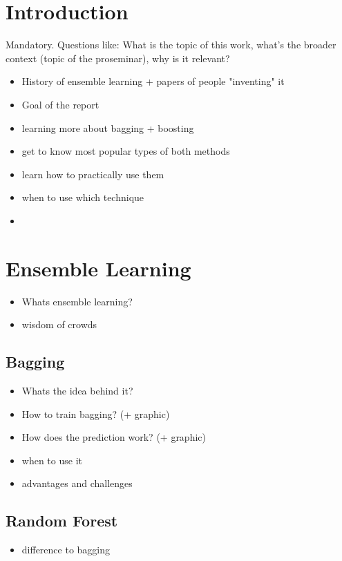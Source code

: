 \section{Introduction}
Mandatory. Questions like: What is the topic of this work, what's the broader context (topic of the proseminar), why is it relevant?

\begin{itemize}
    \item History of ensemble learning + papers of people "inventing" it
    \item Goal of the report
    \item learning more about bagging + boosting
    \item get to know most popular types of both methods
    \item learn how to practically use them
    \item when to use which technique
    \item 
\end{itemize}
\section{Ensemble Learning}
\begin{itemize}
    \item Whats ensemble learning?
    \item wisdom of crowds
\end{itemize}

\subsection{Bagging}
\begin{itemize}
    \item Whats the idea behind it?
    \item How to train bagging? (+ graphic)
    \item How does the prediction work? (+ graphic)
    \item when to use it
    \item advantages and challenges
\end{itemize}

\subsection{Random Forest}
\begin{itemize}
    \item difference to bagging
\end{itemize}


